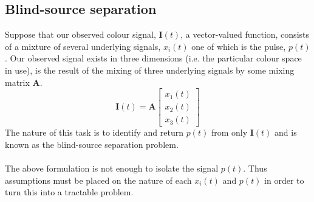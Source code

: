 \subsection{Blind-source separation}
Suppose that our observed colour signal, $\mathbf{I}(t)$, a vector-valued function, consists of a mixture of several underlying signals, $x_i(t)$ one of which is the pulse, $p(t)$. 
Our observed signal exists in three dimensions (i.e. the particular colour space in use), is the result of the mixing of three underlying signals by some mixing matrix $\mathbf{A}$.
\begin{equation*}
    \mathbf{I}(t) = \mathbf{A}\begin{bmatrix} x_1(t) \\ x_2(t) \\ x_3(t) \end{bmatrix}
\end{equation*}
The nature of this task is to identify and return $p(t)$ from only $\mathbf{I}(t)$ and is known as the blind-source separation problem. 
\\ \\
The above formulation is not enough to isolate the signal $p(t)$. Thus assumptions must be placed on the nature of each $x_i(t)$ and $p(t)$ in order to turn this into a tractable problem. 

